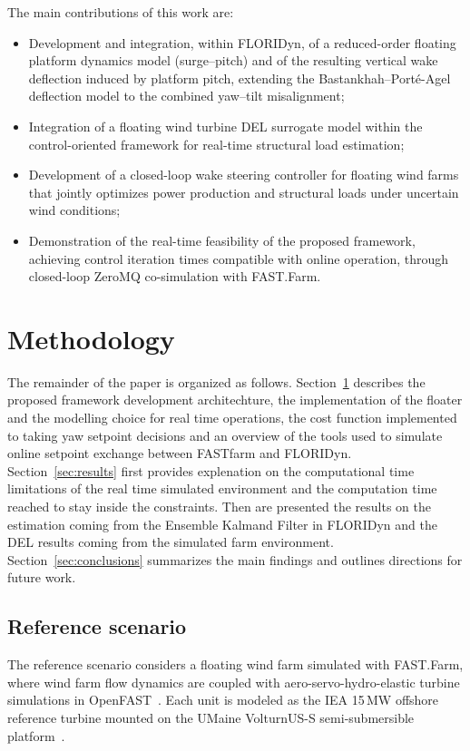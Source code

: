 \documentclass[final,5p,times,twocolumn]{elsarticle}
\begin{document}
The main contributions of this work are:
\begin{itemize}
    \item[(i)] Development and integration, within FLORIDyn, of a reduced-order floating platform dynamics model (surge--pitch) and of the resulting vertical wake deflection induced by platform pitch, extending the Bastankhah--Port\'{e}-Agel deflection model to the combined yaw--tilt misalignment;
    \item[(ii)] Integration of a floating wind turbine DEL surrogate model within the control-oriented framework for real-time structural load estimation;
    \item[(iii)] Development of a closed-loop wake steering controller for floating wind farms that jointly optimizes power production and structural loads under uncertain wind conditions;
    \item[(iv)] Demonstration of the real-time feasibility of the proposed framework, achieving control iteration times compatible with online operation, through closed-loop ZeroMQ co-simulation with FAST.Farm.
\end{itemize}
 




\section{Methodology}
\label{sec:methodology}
The remainder of the paper is organized as follows.
Section~\ref{sec:methodology} describes the proposed framework development architechture, the implementation of the floater and the modelling choice for real time operations, the cost function implemented to taking yaw setpoint decisions and an overview of the tools used to simulate online setpoint exchange between FASTfarm and FLORIDyn.
Section~\ref{sec:results} first provides explenation on the computational time limitations of the real time simulated environment and the computation time reached to stay inside the constraints. Then are presented the results on the estimation coming from the Ensemble Kalmand Filter in FLORIDyn and the DEL results coming from the simulated farm environment.
Section~\ref{sec:conclusions} summarizes the main findings and outlines directions for future work.


\subsection{Reference scenario}
The reference scenario considers a floating wind farm simulated with FAST.Farm, where wind farm flow dynamics are coupled with aero-servo-hydro-elastic turbine simulations in OpenFAST~\cite{jonkman2021fast}. 
Each unit is modeled as the IEA 15\,MW offshore reference turbine mounted on the UMaine VolturnUS-S semi-submersible platform~\cite{gaertner2020iea,allen2020definition}. 
\end{document}
